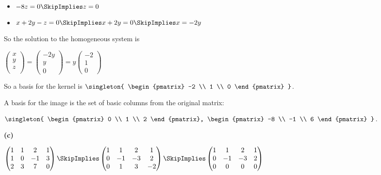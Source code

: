 \documentclass[oneside,12pt]{amsart}
\begin{document}
\begin{itemize}
\item $-8z = 0 \SkipImplies z = 0$
\item $x + 2y - z = 0 \SkipImplies x + 2y = 0 \SkipImplies x = -2y$
\end{itemize}


So the solution to the homogeneous system is

$
\begin{pmatrix}
x \\
y \\
z \\
\end{pmatrix}
=
\begin{pmatrix}
-2y \\
y \\
0
\end{pmatrix}
=
y
\begin{pmatrix}
-2 \\ 1 \\ 0
\end{pmatrix}
$

So a basis for the kernel is
$\singleton{
\begin{pmatrix}
-2 \\ 1 \\ 0
\end{pmatrix}
}$.

A basis for the image is the set of basic columns from the original matrix:

$\singleton{
\begin{pmatrix}
0 \\ 1 \\ 2
\end{pmatrix},
\begin{pmatrix}
-8 \\ -1 \\ 6
\end{pmatrix}
}$.

\bigskip

\textbf{(c)}

\bigskip

$
\begin{pmatrix}
1 & 1 & 2 & 1  \\
1 & 0 & -1 & 3  \\
2 & 3 & 7 & 0
\end{pmatrix}
\SkipImplies
\begin{pmatrix}
1 & 1 & 2 & 1 \\
0 & -1 & -3 & 2  \\
0 & 1 & 3 & -2
\end{pmatrix}
\SkipImplies
\begin{pmatrix}
1 & 1 & 2 & 1  \\
0 & -1 & -3 & 2 \\
0 & 0 & 0 & 0
\end{pmatrix}
$
\end{document}
